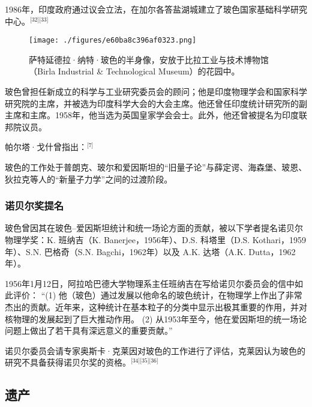 1986年，印度政府通过议会立法，在加尔各答盐湖城建立了玻色国家基础科学研究中心。\(^\text{[32][33]}\)
\begin{figure}[ht]
\centering
\texttt{[image: ./figures/e60ba8c396af0323.png]}
\caption{萨特延德拉·纳特·玻色的半身像，安放于比拉工业与技术博物馆（Birla Industrial & Technological Museum）的花园中。} \label{fig_BOSE_6}
\end{figure}
玻色曾担任新成立的科学与工业研究委员会的顾问；他是印度物理学会和国家科学研究院的主席，并被选为印度科学大会的大会主席。他还曾任印度统计研究所的副主席和主席。1958年，他当选为英国皇家学会会士。此外，他还曾被提名为印度联邦院议员。

帕尔塔·戈什曾指出：\(^\text{[7]}\)

玻色的工作处于普朗克、玻尔和爱因斯坦的“旧量子论”与薛定谔、海森堡、玻恩、狄拉克等人的“新量子力学”之间的过渡阶段。
\subsubsection{诺贝尔奖提名}
玻色曾因其在玻色–爱因斯坦统计和统一场论方面的贡献，被以下学者提名诺贝尔物理学奖：K. 班纳吉（K. Banerjee，1956年）、D.S. 科塔里（D.S. Kothari，1959年）、S.N. 巴格奇（S.N. Bagchi，1962年）以及 A.K. 达塔（A.K. Dutta，1962年）。

1956年1月12日，阿拉哈巴德大学物理系主任班纳吉在写给诺贝尔委员会的信中如此评价：
“(1) 他（玻色）通过发展以他命名的玻色统计，在物理学上作出了非常杰出的贡献。近年来，这种统计在基本粒子的分类中显示出极其重要的作用，并对核物理的发展起到了巨大推动作用。
(2) 从1953年至今，他在爱因斯坦的统一场论问题上做出了若干具有深远意义的重要贡献。”

诺贝尔委员会请专家奥斯卡·克莱因对玻色的工作进行了评估，克莱因认为玻色的研究不具备获得诺贝尔奖的资格。\(^\text{[34][35][36]}\)
\subsection{遗产}